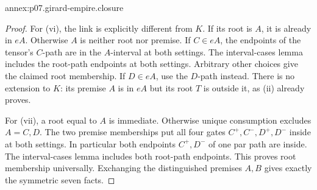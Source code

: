 \begin{annexitem}{annex:p07.girard-empire.closure}
\begin{proof}
For (vi), the link is explicitly different from \(K\).
If its root is \(A\), it is already in \(eA\).
Otherwise \(A\) is neither root nor premise. If \(C\in eA\),
the endpoints of the tensor's \(C\)-path are in the \(A\)-interval
at both settings. The interval-cases lemma includes the root-path
endpoints at both settings. Arbitrary other choices give the claimed
root membership. If \(D\in eA\), use the \(D\)-path instead.
There is no extension to \(K\): its premise \(A\) is in \(eA\)
but its root \(T\) is outside it, as (ii) already proves.

For (vii), a root equal to \(A\) is immediate. Otherwise unique
consumption excludes \(A=C,D\). The two premise memberships put
all four gates \(C^+,C^-,D^+,D^-\) inside at both settings.
In particular both endpoints \(C^+,D^-\) of one par path are inside.
The interval-cases lemma includes both root-path endpoints.
This proves root membership universally. Exchanging the distinguished
premises \(A,B\) gives exactly the symmetric seven facts.
\end{proof}
\end{annexitem}

